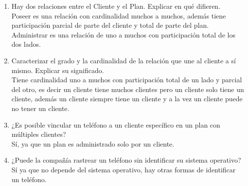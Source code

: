 \documentclass[a4paper, 12pt]{report}
\begin{document}
\begin{enumerate}
{\begin{enumerate}
{\begin{enumerate}
            sistema operativo es muchos a uno, es decir, un sistema
            operativo puede estar en varios tipos de teléfonos, pero
            un tipo de teléfono sólo tiene un sistema operativo.
            \item Hay dos relaciones entre el Cliente y el Plan. Explicar en qué
                difieren.\\
            Poseer es una relación con cardinalidad muchos a muchos,
            además tiene participación parcial de parte del cliente y
            total de parte del plan.\\
            Administrar es una relación de uno a muchos con
            participación total de los dos lados.
            \item Caracterizar el grado y la cardinalidad de la
            relación que une al cliente a sí mismo. Explicar su
            significado.\\
            Tiene cardinalidad uno a muchos con participación total de
            un lado y parcial del otro, es decir un cliente tiene muchos
            clientes pero un cliente solo tiene un cliente,
            además un cliente siempre tiene un cliente y a la vez un
            cliente puede no tener un cliente.
            \item ¿Es posible vincular un teléfono a un cliente
            específico en un plan con múltiples clientes?\\
            Sí, ya que un plan es administrado solo por un cliente.
            \item ¿Puede la compañía rastrear un teléfono sin identificar su
            sistema operativo?\\
            Sí ya que no depende del sistema operativo, hay otras
            formas de identificar un teléfono.

        \end{enumerate}
    }
\end{enumerate}
}
\end{enumerate}
\end{document}
